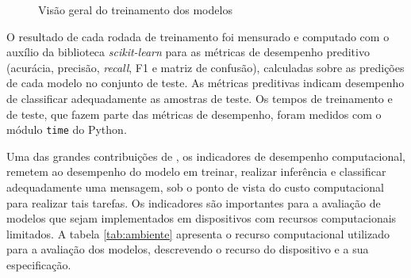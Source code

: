 \documentclass[12pt]{article}
\begin{document}
\begin{figure}[ht]
{%
}
\caption{Visão geral do treinamento dos modelos}
\label{fig:treinamento}
\end{figure}


        O resultado de cada rodada de treinamento foi mensurado e computado com o auxílio da biblioteca  \textit{scikit-learn} para as métricas de desempenho preditivo (acurácia, precisão, \textit{recall}, F1 e matriz de confusão), calculadas sobre as predições de cada modelo no conjunto de teste. As métricas preditivas indicam desempenho de classificar adequadamente as amostras de teste. Os tempos de treinamento e de teste, que fazem parte das métricas de desempenho, foram medidos com o módulo \texttt{time} do Python. 
        
        Uma das grandes contribuições  de  \cite{bispo2025philder}, os indicadores de desempenho computacional, remetem ao desempenho do modelo em treinar, realizar inferência e classificar  adequadamente uma mensagem, sob  o ponto de vista do custo computacional para realizar tais tarefas. Os indicadores são importantes para a avaliação de modelos que sejam implementados em dispositivos com recursos computacionais limitados. A tabela \ref{tab:ambiente} apresenta o recurso computacional utilizado para a avaliação dos modelos, descrevendo o recurso do dispositivo e a sua especificação.
\end{document}

